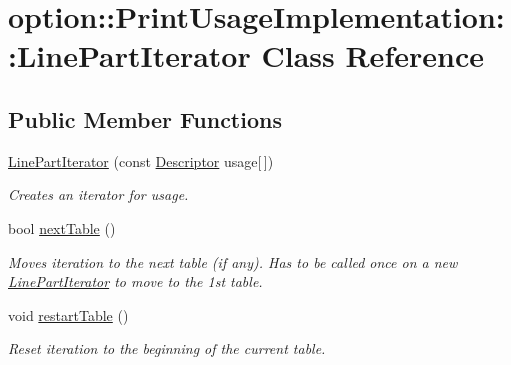 \hypertarget{classoption_1_1PrintUsageImplementation_1_1LinePartIterator}{}\section{option\+:\+:Print\+Usage\+Implementation\+:\+:Line\+Part\+Iterator Class Reference}
\label{classoption_1_1PrintUsageImplementation_1_1LinePartIterator}
\subsection*{Public Member Functions}
\begin{DoxyCompactItemize}
\item 
\mbox{\label{classoption_1_1PrintUsageImplementation_1_1LinePartIterator_a8a61fef9ba907fd4e10ff0fd772ee5e7}} 
\hyperlink{classoption_1_1PrintUsageImplementation_1_1LinePartIterator_a8a61fef9ba907fd4e10ff0fd772ee5e7}{Line\+Part\+Iterator} (const \hyperlink{structoption_1_1Descriptor}{Descriptor} usage\mbox{[}$\,$\mbox{]})
\begin{DoxyCompactList}\small\item\em Creates an iterator for {\ttfamily usage}. \end{DoxyCompactList}\item 
bool \hyperlink{classoption_1_1PrintUsageImplementation_1_1LinePartIterator_afe43ca12d399ed3c871e4dc5bf63356e}{next\+Table} ()
\begin{DoxyCompactList}\small\item\em Moves iteration to the next table (if any). Has to be called once on a new \hyperlink{classoption_1_1PrintUsageImplementation_1_1LinePartIterator}{Line\+Part\+Iterator} to move to the 1st table. \end{DoxyCompactList}\item 
\mbox{\label{classoption_1_1PrintUsageImplementation_1_1LinePartIterator_a0cbe8ed79ab4958a70b957598dd76fa6}} 
void \hyperlink{classoption_1_1PrintUsageImplementation_1_1LinePartIterator_a0cbe8ed79ab4958a70b957598dd76fa6}{restart\+Table} ()
\begin{DoxyCompactList}\small\item\em Reset iteration to the beginning of the current table. \end{DoxyCompactList}\item 

\end{DoxyCompactItemize}
